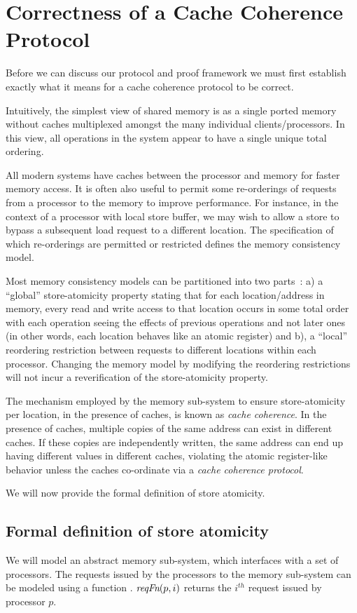\section{Correctness of a Cache Coherence Protocol}
\label{Background}

Before we can discuss our protocol and proof framework we must first establish
exactly what it means for a cache coherence protocol to be correct. 

Intuitively, the simplest view of shared memory is as a single ported memory
without caches multiplexed amongst the many individual clients/processors. In
this view, all operations in the system appear to have a single unique total
ordering.

All modern systems have caches between the processor and memory for faster
memory access.  It is often also useful to permit some re-orderings of requests
from a processor to the memory to improve performance.  For instance, in the
context of a processor with local store buffer, we may wish to allow a store to
bypass a subsequent load request to a different location. The specification of
which re-orderings are permitted or restricted defines the memory consistency
model.

Most memory consistency models can be partitioned into two
parts~\cite{Arvind-memory-model}: a) a ``global'' store-atomicity property
stating that for each location/address in memory, every read and write access
to that location occurs in some total order with each operation seeing the
effects of previous operations and not later ones (in other words, each
location behaves like an atomic register) and b), a ``local'' reordering
restriction between requests to different locations within each processor.
Changing the memory model by modifying the reordering restrictions will not
incur a reverification of the store-atomicity property.

The mechanism employed by the memory sub-system to ensure store-atomicity per
location, in the presence of caches, is known as \emph{cache coherence}. In the
presence of caches, multiple copies of the same address can exist in different
caches. If these copies are independently written, the same address can end up
having different values in different caches, violating the atomic register-like
behavior unless the caches co-ordinate via a \emph{cache coherence protocol}.

We will now provide the formal definition of store atomicity.

\subsection{Formal definition of store atomicity}
We will model an abstract memory sub-system, which interfaces with a set of
processors. The requests issued by the processors to the memory sub-system can
be modeled using a function \reqFn. $\textit{reqFn}(p, i)$ returns the $i^{th}$ request
issued by processor $p$.

